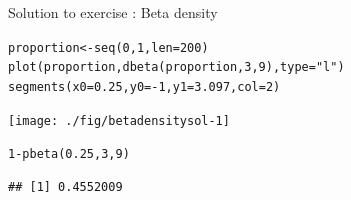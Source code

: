 \documentclass[xcolor=table,           xcolor=dvipsnames]{beamer}\usepackage[]{graphicx}\usepackage[]{color}
\makeatletter
\newcommand{\hlnum}[1]{\textcolor[rgb]{0,0,0}{#1}}
\newcommand{\hlstr}[1]{\textcolor[rgb]{0.545,0.137,0.137}{#1}}
\newcommand{\hlopt}[1]{\textcolor[rgb]{0,0,0}{#1}}
\newcommand{\hlstd}[1]{\textcolor[rgb]{0,0,0}{#1}}
\newcommand{\hlkwb}[1]{\textcolor[rgb]{0,0,0}{#1}}
\newcommand{\hlkwc}[1]{\textcolor[rgb]{1,0,1}{#1}}
\newcommand{\hlkwd}[1]{\textcolor[rgb]{0,0,1}{#1}}
\newenvironment{kframe}{%
 \def\at@end@of@kframe{}%
 \ifinner\ifhmode%
  \def\at@end@of@kframe{\end{minipage}}%
  \begin{minipage}{\columnwidth}%
 \fi\fi%
 \def\FrameCommand##1{\hskip\@totalleftmargin \hskip-\fboxsep
 \colorbox{shadecolor}{##1}\hskip-\fboxsep
     \hskip-\linewidth \hskip-\@totalleftmargin \hskip\columnwidth}%
 \MakeFramed {\advance\hsize-\width
   \@totalleftmargin\z@ \linewidth\hsize
   \@setminipage}}%
 {\par\unskip\endMakeFramed%
 \at@end@of@kframe}
\newenvironment{knitrout}{}{} %
\newcounter{exercisecount}
\makeatother
\begin{document}
\begin{frame}[fragile]{Solution to exercise : Beta density}
\vspace{-1em}
\begin{knitrout}
\color{fgcolor}\begin{kframe}
\begin{alltt}
\hlstd{proportion} \hlkwb{<-} \hlkwd{seq}\hlstd{(}\hlnum{0}\hlstd{,}\hlnum{1}\hlstd{,} \hlkwc{len}\hlstd{=}\hlnum{200}\hlstd{)}
\hlkwd{plot}\hlstd{(proportion,} \hlkwd{dbeta}\hlstd{(proportion,} \hlnum{3}\hlstd{,}\hlnum{9}\hlstd{),} \hlkwc{type}\hlstd{=}\hlstr{"l"}\hlstd{)}
\hlkwd{segments}\hlstd{(}\hlkwc{x0}\hlstd{=}\hlnum{0.25}\hlstd{,} \hlkwc{y0}\hlstd{=}\hlopt{-}\hlnum{1}\hlstd{,} \hlkwc{y1}\hlstd{=}\hlnum{3.097}\hlstd{,} \hlkwc{col}\hlstd{=}\hlnum{2}\hlstd{)}
\end{alltt}
\end{kframe}

{\centering \texttt{[image: ./fig/betadensitysol-1]} 

}



\end{knitrout}
\vspace{-1em}
\pause
\begin{knitrout}
\color{fgcolor}\begin{kframe}
\begin{alltt}
\hlnum{1}\hlopt{-}\hlkwd{pbeta}\hlstd{(}\hlnum{0.25}\hlstd{,} \hlnum{3}\hlstd{,}\hlnum{9}\hlstd{)}
\end{alltt}
\begin{verbatim}
## [1] 0.4552009
\end{verbatim}
\end{kframe}
\end{knitrout}
\end{frame}

\end{document}
